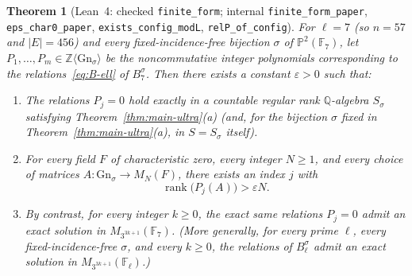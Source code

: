 \documentclass[11pt]{article}
\newtheorem{theorem}{Theorem}[section]
\theoremstyle{definition}
\theoremstyle{remark}
\numberwithin{equation}{section}
\DeclareMathOperator{\rank}{rank}
\newcommand{\Q}{\mathbb{Q}}
\newcommand{\Z}{\mathbb{Z}}
\newcommand{\F}{\mathbb{F}}
\newcommand{\1}{\mathbf{1}}
\newcommand{\code}[1]{{\normalfont\small\texttt{#1}}}
\begin{document}
\begin{theorem}[Lean~4: checked \code{finite\_form}; internal \code{finite\_form\_paper}, \code{eps\_char0\_paper}, \code{exists\_config\_modL}, \code{relP\_of\_config}]
\label{thm:finite-form}
For $\ell = 7$ (so $n = 57$ and $|E| = 456$) and every fixed-incidence-free bijection $\sigma$ of $\mathbb{P}^2(\F_7)$, let $P_1, \dots, P_m \in \Z\langle \mathrm{Gn}_\sigma \rangle$ be the noncommutative integer polynomials corresponding to the relations~\eqref{eq:B-ell} of $B_7^\sigma$. Then there exists a constant $\varepsilon > 0$ such that:
\begin{enumerate}[label=\textup{(\alph*)},leftmargin=2.2em]
\item The relations $P_j = 0$ hold exactly in a countable regular rank $\Q$-algebra $S_\sigma$ satisfying Theorem~\ref{thm:main-ultra}\textup{(a)} (and, for the bijection $\sigma$ fixed in Theorem~\ref{thm:main-ultra}\textup{(a)}, in $S = S_\sigma$ itself).
\item For every field $F$ of characteristic zero, every integer $N \ge 1$, and every choice of matrices $A\colon \mathrm{Gn}_\sigma \to M_N(F)$, there exists an index $j$ with
\[
\rank\bigl(P_j(A)\bigr) > \varepsilon N.
\]
\item By contrast, for every integer $k \ge 0$, the exact same relations $P_j = 0$ admit an exact solution in $M_{3^{3k+1}}(\F_7)$. (More generally, for every prime $\ell$, every fixed-incidence-free $\sigma$, and every $k \ge 0$, the relations of $B_\ell^\sigma$ admit an exact solution in $M_{3^{3k+1}}(\F_\ell)$.)
\end{enumerate}
\end{theorem}
\end{document}
